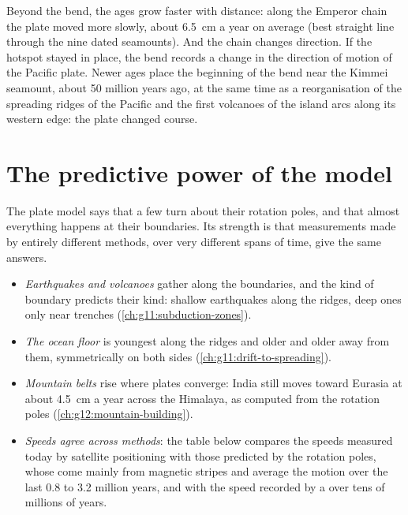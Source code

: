 Beyond the bend, the ages grow faster with distance: along the Emperor
chain the plate moved more slowly, about \qty{6.5}{cm} a year on average
(best straight line through the nine dated seamounts). And the chain changes
direction. If the hotspot stayed in place, the bend records a change in the
direction of motion of the Pacific plate. Newer ages place
the beginning of the bend near the Kimmei seamount, about 50 million years
ago, at the same time as a reorganisation of the spreading ridges of the
Pacific and the first volcanoes of the island arcs along its western edge:
the plate changed course.

\section{The predictive power of the model}\label{sec:g11:plate-motions:predictive}

The plate model says that a few  turn about their rotation poles,
and that almost everything happens at their boundaries. Its strength is that
measurements made by entirely different methods, over very different spans of
time, give the same answers.

\begin{itemize}
  \item \emph{Earthquakes and volcanoes} gather along the boundaries, and the
        kind of boundary predicts their kind: shallow earthquakes along the
        ridges, deep ones only near trenches (\cref{ch:g11:subduction-zones}).
  \item \emph{The ocean floor} is youngest along the ridges and older and
        older away from them, symmetrically on both sides
        (\cref{ch:g11:drift-to-spreading}).
  \item \emph{Mountain belts} rise where plates converge: India still moves
        toward Eurasia at about \qty{4.5}{cm} a year across the Himalaya,
        as computed from the rotation poles (\cref{ch:g12:mountain-building}).
  \item \emph{Speeds agree across methods}: the table below compares the
        speeds measured today by satellite positioning with those predicted
        by the rotation poles, whose  come mainly from
        magnetic stripes and average the motion over the last
        \num{0.8} to \num{3.2} million years, and with the speed recorded
        by a  over tens of millions of years.
\end{itemize}


